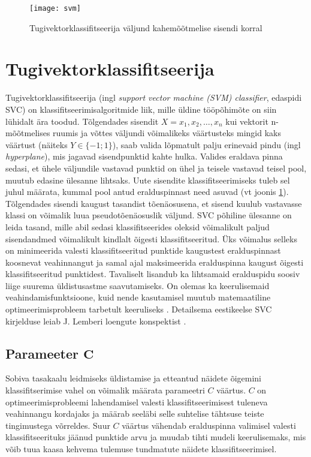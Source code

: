 \documentclass[]{trkuur}
\let\eng\emph
\begin{document}
\begin{figure}[h!]
\texttt{[image: svm]}
\caption{Tugivektorklassifitseerija väljund kahemõõtmelise sisendi korral}
\label{svmjoonis}
\end{figure}

\section{Tugivektorklassifitseerija}
Tugivektorklassifitseerija (ingl \eng{support vector machine (SVM) classifier}, edaspidi SVC)
on klassifitseerimisalgoritmide liik, mille üldine tööpõhimõte on siin lühidalt ära toodud.
Tõlgendades sisendit \( X = x_1,x_2,\dots,x_n \) kui vektorit n-mõõtmelises
ruumis ja võttes väljundi võimalikeks väärtusteks mingid kaks väärtust (näiteks
\( Y \in \{-1;1\} \)), saab valida lõpmatult palju erinevaid pindu (ingl \eng{hyperplane}), mis jagavad
sisendpunktid kahte hulka. Valides eraldava pinna sedasi, et ühele väljundile
vastavad punktid on ühel ja teisele vastavad teisel pool, muutub edasine
ülesanne lihtsaks. Uute sisendite
klassifitseerimiseks tuleb sel juhul määrata, kummal pool antud eralduspinnast need
asuvad (vt joonis \ref{svmjoonis}). Tõlgendades sisendi kaugust tasandist tõenäosusena, et sisend kuulub
vastavasse klassi on võimalik luua pseudotõenäosuslik väljund.
SVC põhiline ülesanne on leida tasand, mille abil sedasi klassifitseerides
oleksid võimalikult paljud sisendandmed võimalikult kindlalt õigesti
klassifitseeritud. Üks võimalus selleks on minimeerida valesti klassifitseeritud
punktide kaugustest eralduspinnast koosnevat veahinnangut ja samal ajal
maksimeerida eralduspinna kaugust õigesti klassifitseeritud punktidest.
Tavaliselt lisandub ka lihtsamaid eralduspidu soosiv liige suurema üldistusastme
saavutamiseks.
On olemas ka keerulisemaid veahindamisfunktsioone, kuid nende kasutamisel
muutub matemaatiline optimeerimisprobleem tarbetult keeruliseks \autocite{wiki-support-vector-machine}.
Detailsema eestikeelse SVC kirjelduse leiab J. Lemberi loengute konspektist \autocite[64-86]{JLember2008}.

\subsection[Parameeter \( C \)]{Parameeter \(\mathbf{C}\)}
Sobiva tasakaalu leidmiseks üldistamise ja etteantud näidete õigemini klassifitserimise
vahel on võimalik määrata parameetri $C$ väärtus. $C$ on optimeerimisprobleemi
lahendamisel valesti klassifitseerimisest tuleneva veahinnangu kordajaks ja
määrab seeläbi selle suhtelise tähtsuse teiste tingimustega võrreldes.
Suur $C$ väärtus vähendab eralduspinna valimisel valesti klassifitseerituks
jäänud punktide arvu ja muudab tihti mudeli keerulisemaks, mis võib tuua
kaasa kehvema tulemuse tundmatute näidete klassifitseerimisel.
\autocite{dtregsvm} \autocite{svmparams} \autocite[78-84]{JLember2008}
\end{document}
